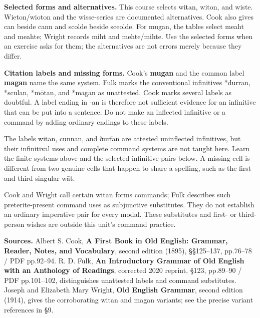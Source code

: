 \textbf{Selected forms and alternatives.} This course selects witan, witon, and wiste. Wieton/\allowbreak{}wioton and the wisse-series are documented alternatives. Cook also gives can beside cann and scolde beside sceolde. For mugan, the tables select meaht and meahte; Wright records miht and mehte/\allowbreak{}mihte. Use the selected forms when an exercise asks for them; the alternatives are not errors merely because they differ.

\textbf{Citation labels and missing forms.} Cook’s \textbf{mugan} and the common label \textbf{magan} name the same system. Fulk marks the conventional infinitives *durran, *sculan, *mōtan, and *magan as unattested. Cook marks several labels as doubtful. A label ending in -an is therefore not sufficient evidence for an infinitive that can be put into a sentence. Do not make an inflected infinitive or a command by adding ordinary endings to these labels.

The labels witan, cunnan, and ðurfan are attested uninflected infinitives, but their infinitival uses and complete command systems are not taught here. Learn the finite systems above and the selected infinitive pairs below. A missing cell is different from two genuine cells that happen to share a spelling, such as the first and third singular wāt.

Cook and Wright call certain witan forms commands; Fulk describes such preterite-present command uses as subjunctive substitutes. They do not establish an ordinary imperative pair for every modal. These substitutes and first- or third-person wishes are outside this unit’s command practice.

\textbf{Sources.} Albert S. Cook, \textbf{A First Book in Old English: Grammar, Reader, Notes, and Vocabulary}, second edition (1895), §§125–137, pp.76–78 /\allowbreak{} PDF pp.92–94. R. D. Fulk, \textbf{An Introductory Grammar of Old English with an Anthology of Readings}, corrected 2020 reprint, §123, pp.89–90 /\allowbreak{} PDF pp.101–102, distinguishes unattested labels and command substitutes. Joseph and Elizabeth Mary Wright, \textbf{Old English Grammar}, second edition (1914), gives the corroborating witan and magan variants; see the precise variant references in §9.

